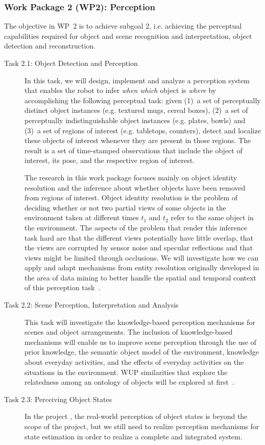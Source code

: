 \subsubsection{Work Package 2 (WP2): Perception}
\label{sec:wp2}
The objective in WP~2 is to achieve subgoal 2, i.e. achieving the
perceptual capabilities required for object and scene recognition and
interpretation, object detection and reconstruction. 
\begin{description}
\item[Task 2.1: Object Detection and Perception] In this task, we will
  design, implement and analyze a perception system that enables
  the robot to infer \emph{when} \emph{which} object is \emph{where} by
  accomplishing the following perceptual task: given (1)~a set of
  perceptually distinct object instances (e.g. textured mugs, cereal boxes), 
  (2)~a set of perceptually indistinguishable object instances
  (e.g. plates, bowls) and (3)~a set of regions of interest (e.g. tabletops, counters),
  detect and localize these objects of interest whenever they are present in those regions.
  The result is a set of time-stamped observations that
  include the object of interest, its pose, and the respective region of
  interest.

  The research in this work package focuses mainly on object identity resolution 
  and the inference about whether objects have been removed from regions of interest.
  Object identity resolution is the problem of deciding whether or not two partial views
  of some objects in the environment taken at different times $t_1$ and
  $t_2$ refer to the same object in the environment. The aspects of the problem
  that render this inference task hard are that the different views potentially have
  little overlap, that the views are corrupted by sensor
  noise and specular reflections and that views might be limited
  through occlusions. We will investigate how we can apply and adapt
  mechanisms from entity resolution originally developed in the area of data
  mining to better handle the spatial and temporal context
  of this perception task~\cite{Blodow10Humanoids}.
\item[Task 2.2: Scene Perception, Interpretation and Analysis]
  This task will investigate the knowledge-based perception
  mechanisms for scenes and object arrangements. The inclusion of
  knowledge-based mechanisms will enable us to improve scene perception
  through the use of prior knowledge, the semantic object model of the
  environment, knowledge about everyday activities, and the effects of
  everyday activities on the situations in the environment. WUP similarities
  that explore the relatedness among an ontology of objects will be explored
  at first~\cite{wup}.
\item[Task 2.3: Perceiving Object States]
  In the project \ksem, the real-world perception of object states is
  beyond the scope of the project, but we still need to realize
  perception mechanisms for state estimation in order to realize a
  complete and integrated system.


\end{description}
